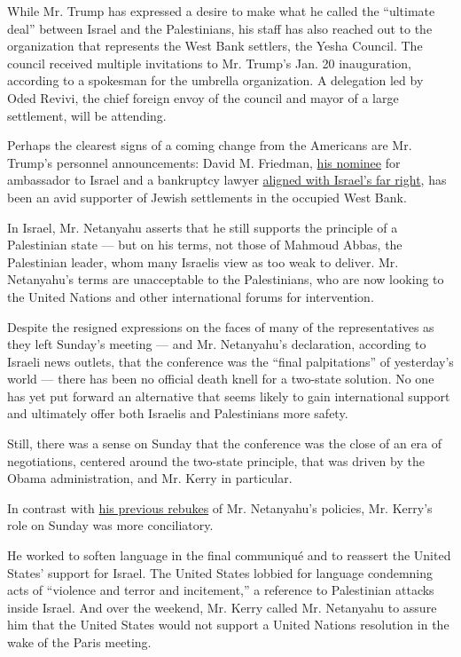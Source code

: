 While Mr. Trump has expressed a desire to make what he called the
``ultimate deal'' between Israel and the Palestinians, his staff has
also reached out to the organization that represents the West Bank
settlers, the Yesha Council. The council received multiple invitations
to Mr. Trump's Jan. 20 inauguration, according to a spokesman for the
umbrella organization. A delegation led by Oded Revivi, the chief
foreign envoy of the council and mayor of a large settlement, will be
attending.

Perhaps the clearest signs of a coming change from the Americans are Mr.
Trump's personnel announcements: David M. Friedman,
\href{https://www.nytimes3xbfgragh.onion/2016/12/15/us/politics/donald-trump-david-friedman-israel-ambassador.html}{his
nominee} for ambassador to Israel and a bankruptcy lawyer
\href{https://www.nytimes3xbfgragh.onion/2016/12/16/world/middleeast/david-friedman-us-ambassador-israel.html}{aligned
with Israel's far right}, has been an avid supporter of Jewish
settlements in the occupied West Bank.

In Israel, Mr. Netanyahu asserts that he still supports the principle of
a Palestinian state --- but on his terms, not those of Mahmoud Abbas,
the Palestinian leader, whom many Israelis view as too weak to deliver.
Mr. Netanyahu's terms are unacceptable to the Palestinians, who are now
looking to the United Nations and other international forums for
intervention.

Despite the resigned expressions on the faces of many of the
representatives as they left Sunday's meeting --- and Mr. Netanyahu's
declaration, according to Israeli news outlets, that the conference was
the ``final palpitations'' of yesterday's world --- there has been no
official death knell for a two-state solution. No one has yet put
forward an alternative that seems likely to gain international support
and ultimately offer both Israelis and Palestinians more safety.

Still, there was a sense on Sunday that the conference was the close of
an era of negotiations, centered around the two-state principle, that
was driven by the Obama administration, and Mr. Kerry in particular.

In contrast with
\href{https://www.nytimes3xbfgragh.onion/2016/12/28/us/politics/john-kerry-israel-palestine-peace.html}{his
previous rebukes} of Mr. Netanyahu's policies, Mr. Kerry's role on
Sunday was more conciliatory.

He worked to soften language in the final communiqué and to reassert the
United States' support for Israel. The United States lobbied for
language condemning acts of ``violence and terror and incitement,'' a
reference to Palestinian attacks inside Israel. And over the weekend,
Mr. Kerry called Mr. Netanyahu to assure him that the United States
would not support a United Nations resolution in the wake of the Paris
meeting.

